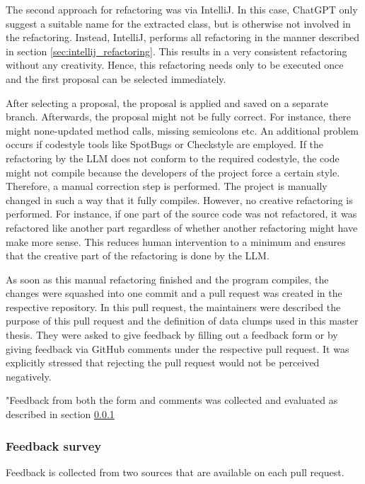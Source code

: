 The second approach for refactoring was via IntelliJ. In this case, ChatGPT only suggest a suitable name for the extracted class, but is otherwise not involved in the refactoring. Instead, IntelliJ, performs all refactoring in the manner described in section  \ref{sec:intellij_refactoring}. This results in a very consistent refactoring without any creativity. Hence, this refactoring needs only to be executed once and the first proposal can be selected immediately. 


After selecting a proposal, the proposal is applied and saved on a separate branch.
Afterwards, the proposal might not be fully correct. For instance, there might none-updated method calls, missing semicolons etc. An additional problem occurs if codestyle tools like SpotBugs or Checkstyle are employed. If the refactoring by the \ac{LLM} does not conform to the required codestyle, the code might not compile because the developers of the project force a certain style. Therefore, a manual correction step is performed. The project is  manually changed in such a way that it fully compiles. However, no creative refactoring is performed. For instance, if one part of the source code was not refactored, it was refactored like another part regardless of whether another refactoring might have make more sense. This reduces human intervention to a minimum and ensures that the creative part of the refactoring is done by the \ac{LLM}. 

As soon as this manual refactoring finished and the program compiles, the changes were squashed into one commit and a pull request was created in the respective repository. In this pull request, the maintainers were described the purpose of this pull request and  the definition of data clumps used in this master thesis. They were asked to give feedback by filling out a feedback form or by giving feedback via GitHub comments under the respective pull request. It was explicitly stressed that rejecting the pull request would not be perceived negatively. 

"Feedback from both the form and comments was collected and evaluated as described in 
 section \ref{sec:feedback_survey}

\subsubsection{Feedback survey}\label{sec:feedback_survey}

Feedback is collected from two sources that are available on each pull request. 

